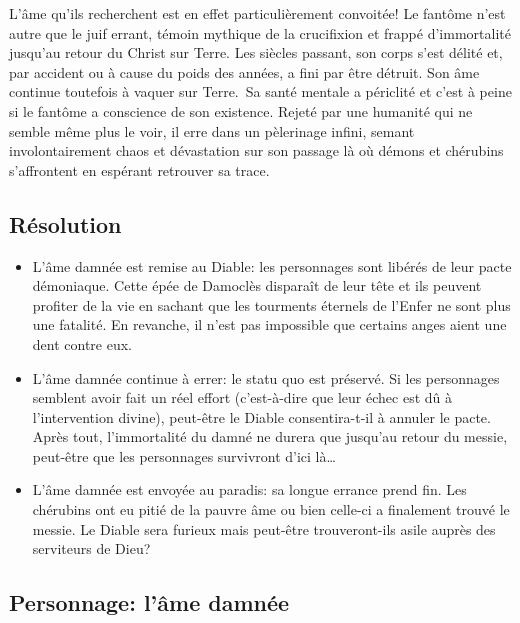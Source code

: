 L'âme qu'ils recherchent est en effet particulièrement convoitée!
Le fantôme n'est autre que le juif errant, témoin mythique de la crucifixion et frappé d'immortalité jusqu'au retour du Christ sur Terre.
Les siècles passant, son corps s'est délité et, par accident ou à cause du poids des années, a fini par être détruit.
Son âme continue toutefois à vaquer sur Terre. Sa santé mentale a périclité et c'est à peine si le fantôme a conscience de son existence.
Rejeté par une humanité qui ne semble même plus le voir, il erre dans un pèlerinage infini, semant involontairement chaos et dévastation sur son passage là où démons et chérubins s'affrontent en espérant retrouver sa trace.

\subsection{Résolution}

\begin{itemize}
	\item L'âme damnée est remise au Diable: les personnages sont libérés de leur pacte démoniaque. Cette épée de Damoclès disparaît de leur tête et ils peuvent profiter de la vie en sachant que les tourments éternels de l'Enfer ne sont plus une fatalité. En revanche, il n'est pas impossible que certains anges aient une dent contre eux.
	\item L'âme damnée continue à errer: le statu quo est préservé. Si les personnages semblent avoir fait un réel effort (c'est-à-dire que leur échec est dû à l'intervention divine), peut-être le Diable consentira-t-il à annuler le pacte. Après tout, l'immortalité du damné ne durera que jusqu'au retour du messie, peut-être que les personnages survivront d'ici là\dots
	\item L'âme damnée est envoyée au paradis: sa longue errance prend fin. Les chérubins ont eu pitié de la pauvre âme ou bien celle-ci a finalement trouvé le messie. Le Diable sera furieux mais peut-être trouveront-ils asile auprès des serviteurs de Dieu?
\end{itemize}

\subsection*{Personnage: l'âme damnée}


